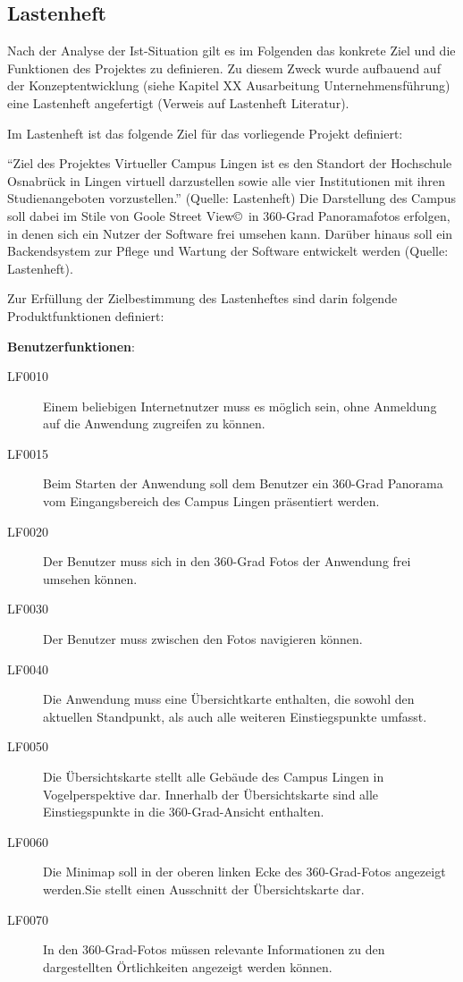 \subsection{Lastenheft}
\label{sec:Lastenheft}

Nach der Analyse der Ist-Situation gilt es im Folgenden das konkrete Ziel und die Funktionen des Projektes zu definieren. 
Zu diesem Zweck wurde aufbauend auf der Konzeptentwicklung (siehe Kapitel XX Ausarbeitung Unternehmensführung) eine 
Lastenheft angefertigt (Verweis auf Lastenheft Literatur).

Im Lastenheft ist das folgende Ziel für das vorliegende Projekt definiert:

"`Ziel des Projektes Virtueller Campus Lingen ist es den Standort der Hochschule Osnabrück
in Lingen virtuell darzustellen sowie alle vier Institutionen mit ihren Studienangeboten
vorzustellen."' (Quelle: Lastenheft)
Die Darstellung des Campus soll dabei im Stile von Goole Street View\copyright\ in 360-Grad Panoramafotos erfolgen, in 
denen sich ein Nutzer der Software frei umsehen kann. Darüber hinaus soll ein Backendsystem zur Pflege und Wartung der 
Software entwickelt werden (Quelle: Lastenheft).

Zur Erfüllung der Zielbestimmung des Lastenheftes sind darin folgende Produktfunktionen definiert:

\textbf{Benutzerfunktionen}:

\begin{description}
  \item[LF0010] Einem beliebigen Internetnutzer muss es möglich sein, ohne Anmeldung auf die Anwendung zugreifen zu können.
  \item[LF0015] Beim Starten der Anwendung soll dem Benutzer ein 360-Grad Panorama vom Eingangsbereich des Campus Lingen 
  präsentiert werden.
  \item[LF0020] Der Benutzer muss sich in den 360-Grad Fotos der Anwendung frei umsehen können.
  \item[LF0030] Der Benutzer muss zwischen den Fotos navigieren können.
  \item[LF0040] Die Anwendung muss eine Übersichtkarte enthalten, die sowohl den aktuellen Standpunkt, als auch alle 
  weiteren Einstiegspunkte umfasst.
  \item[LF0050] Die Übersichtskarte stellt alle Gebäude des Campus Lingen in Vogelperspektive dar. Innerhalb der 
  Übersichtskarte sind alle Einstiegspunkte in die 360-Grad-Ansicht enthalten.
  \item[LF0060] Die Minimap soll in der oberen linken Ecke des 360-Grad-Fotos angezeigt werden.Sie stellt einen Ausschnitt 
  der Übersichtskarte dar.
  \item[LF0070] In den 360-Grad-Fotos müssen relevante Informationen zu den dargestellten Örtlichkeiten angezeigt werden können.
\end{description}

